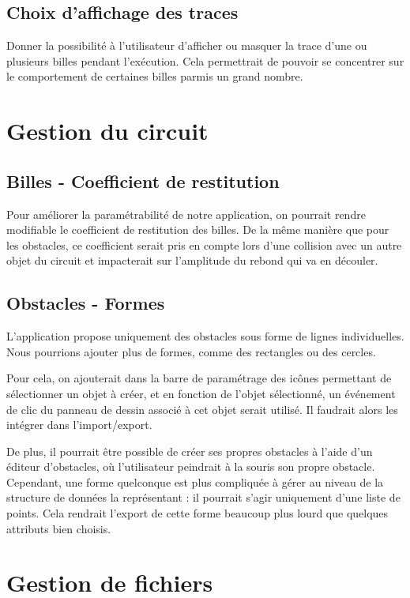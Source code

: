 \documentclass{report}
\begin{document}
\subsection{Choix d'affichage des traces}

Donner la possibilité à l’utilisateur d’afficher ou masquer la trace d’une ou plusieurs billes pendant l’exécution. Cela permettrait de pouvoir se concentrer sur le comportement de certaines billes parmis un grand nombre.

\section{Gestion du circuit}

\subsection{Billes - Coefficient de restitution}

Pour améliorer la paramétrabilité de notre application, on pourrait rendre modifiable le coefficient de restitution des billes. De la même manière que pour les obstacles, ce coefficient serait pris en compte lors d’une collision avec un autre objet du circuit et impacterait sur l’amplitude du rebond qui va en découler.

\subsection{Obstacles - Formes}

L’application propose uniquement des obstacles sous forme de lignes individuelles. Nous pourrions ajouter plus de formes, comme des rectangles ou des cercles.

Pour cela, on ajouterait dans la barre de paramétrage des icônes permettant de sélectionner un objet à créer, et en fonction de l’objet sélectionné, un événement de clic du panneau de dessin associé à cet objet serait utilisé. Il faudrait alors les intégrer dans l’import/export.

De plus, il pourrait être possible de créer ses propres obstacles à l’aide d’un éditeur d’obstacles, où l’utilisateur peindrait à la souris son propre obstacle. Cependant, une forme quelconque est plus compliquée à gérer au niveau de la structure de données la représentant : il pourrait s’agir uniquement d’une liste de points. Cela rendrait l’export de cette forme beaucoup plus lourd que quelques attributs bien choisis.


\section{Gestion de fichiers}
\end{document}
